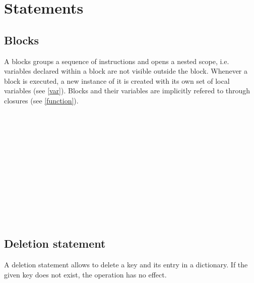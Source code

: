 \chapter{Statements}

\section{Blocks}

A blocks groups a sequence of instructions and opens a nested scope,
i.e. variables declared within a block are not visible outside the
block. Whenever a block is executed, a new instance of it is created
with its own set of local variables (see \ref{var}). Blocks and
their variables are implicitly refered to through closures
(see \ref{function}).

\begin{grammar}
      \produces \lextoken{\{} \lextoken{\}} \\
      \produces \lextoken{\{}  \lextoken{\}} \\
      \produces {} \\
      \produces {}  \\
      \produces {} \lextoken{;} \\
      \produces {} \lextoken{;} \\
      \produces {} \\
      \produces {} \\
      \produces {} \\
      \produces {} \lextoken{;} \\
      \produces {} \lextoken{;} \\
\end{grammar}

\section{Deletion statement}

A deletion statement allows to delete a key and its entry
in a dictionary. If the given key does not exist, the operation
has no effect.

\begin{grammar}
      \produces {} 
\end{grammar}

